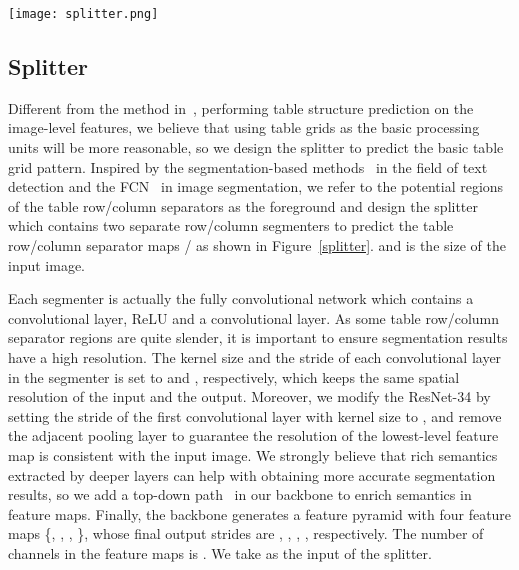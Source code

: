 \documentclass[review]{elsarticle}
\begin{document}
\begin{figure*}[htb]
	\centerline{\texttt{[image: splitter.png]}}
	\caption{The illustration of the splitter. The splitter takes a feature map as input and predicts the potential regions of the table row/column separators, which are the green masks in the table images. The following post-processing is used to extract the basic table grids according to the segmentation results from the segmenters.}
	\label{splitter}
\end{figure*}

\subsection{Splitter}
Different from the method in~\cite{EDD}, performing table structure prediction on the image-level features, we believe that using table grids as the basic processing units will be more reasonable, so we design the splitter to predict the basic table grid pattern. Inspired by the segmentation-based methods~\cite{TextMountain, MaskTextSpotter} in the field of text detection and the FCN~\cite{FCN} in image segmentation, we refer to the potential regions of the table row/column separators as the foreground and design the splitter which contains two separate row/column segmenters to predict the table row/column separator maps / as shown in Figure~\ref{splitter}.  and  is the size of the input image. 

Each segmenter is actually the fully convolutional network which contains a convolutional layer, ReLU and a convolutional layer. As some table row/column separator regions are quite slender, it is important to ensure segmentation results have a high resolution. The kernel size and the stride of each convolutional layer in the segmenter is set to  and , respectively, which keeps the same spatial resolution of the input and the output. Moreover, we modify the ResNet-34 by setting the stride of the first convolutional layer with  kernel size to , and remove the adjacent pooling layer to guarantee the resolution of the lowest-level feature map is consistent with the input image. We strongly believe that rich semantics extracted by deeper layers can help with obtaining more accurate segmentation results, so we add a top-down path~\cite{FPN} in our backbone to enrich semantics in feature maps. Finally, the backbone generates a feature pyramid with four feature maps \{, , , \}, whose final output strides are , , , , respectively. The number of channels in the feature maps is . We take  as the input of the splitter.
\end{document}
